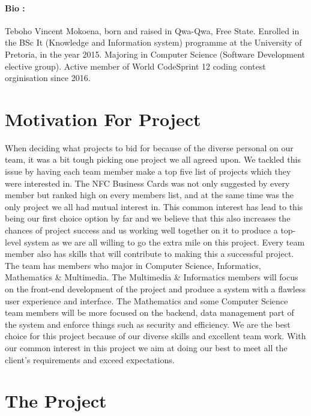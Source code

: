 \documentclass[11pt]{article}
\begin{document}
\paragraph{Bio :} Teboho Vincent Mokoena, born and raised in Qwa-Qwa, Free State. Enrolled in
the BSc It (Knowledge and Information system) programme at the University of
Pretoria, in the year 2015. Majoring in Computer Science (Software
Development elective group). Active member of World CodeSprint 12 coding
contest orginisation since 2016.

\section{Motivation For Project}
When deciding what projects to bid for because of the diverse personal on our team, it was a bit tough picking one project we all agreed upon. We tackled this issue by having each team member make a top five list of projects which they were interested in. The NFC Business Cards was not only suggested by every member but ranked high on every members list, and at the same time was the only project we all had mutual interest in. This common interest has lead to this being our first choice option by far and we believe that this also increases the chances of project success and us working well together on it to produce a top-level system as we are all willing to go the extra mile on this project.
\newline
\newline Every team member also has skills that will contribute to making this a successful project. The team has members who major in Computer Science, Informatics, Mathematics \& Multimedia. The Multimedia \& Informatics members will focus on the front-end development of the project and produce a system with a flawless user experience and interface. The Mathematics and some Computer Science team members will be more focused on the backend, data management part of the system and enforce things such as security and efficiency.
\newline
\newline We are the best choice for this project because of our diverse skills and excellent team work. With our common interest in this project we aim at doing our best to meet all the client's requirements and exceed expectations.

\section{The Project}
\end{document}
